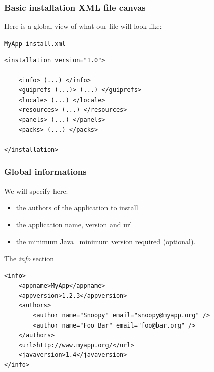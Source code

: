 \documentclass{beamer}
\begin{document}
\begin{frame}[containsverbatim]

\frametitle{Basic installation XML file canvas}

Here is a global view of what our file will look like:

\begin{block}{\texttt{MyApp-install.xml}}
\small
\begin{verbatim}
<installation version="1.0">

    <info> (...) </info>
    <guiprefs (...)> (...) </guiprefs>
    <locale> (...) </locale>
    <resources> (...) </resources>
    <panels> (...) </panels>
    <packs> (...) </packs>

</installation>
\end{verbatim}
\end{block}

\end{frame}


\begin{frame}[containsverbatim]

\frametitle{Global informations}

We will specify here:
  \begin{itemize}
      \item the authors of the application to install
      \item the application name, version and url
      \item the minimum Java\texttrademark~ minimum version required (optional).
  \end{itemize}

\begin{block}{The \textsl{info} section}
\tiny
\begin{verbatim}
<info>
    <appname>MyApp</appname>
    <appversion>1.2.3</appversion>
    <authors>
        <author name="Snoopy" email="snoopy@myapp.org" />
        <author name="Foo Bar" email="foo@bar.org" />
    </authors>
    <url>http://www.myapp.org/</url>
    <javaversion>1.4</javaversion>
</info>
\end{verbatim}
\end{block}

\end{frame}

\end{document}
